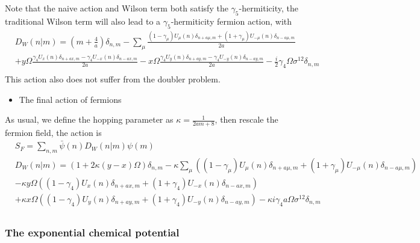 Note that the naive action and Wilson term both satisfy the $\gamma _5$-hermiticity, the traditional Wilson term will also lead to a $\gamma _5$-hermiticity fermion action, with
\begin{equation}
\begin{split}
&D_W(n|m)=\left(m+\frac{4}{a}\right)\delta _{n,m}-\sum _{\mu}\frac{(1-\gamma _{\mu})U_{\mu}(n)\delta _{n+a\mu,m}+(1+\gamma _{\mu})U_{-\mu}(n)\delta _{n-a\mu,m}}{2a}\\
&+y\Omega \frac{\gamma _4U_{x}(n)\delta _{n+ax,m}-\gamma _4U_{-x}(n)\delta _{n-ax,m}}{2a}-x\Omega \frac{\gamma _4U_{y}(n)\delta _{n+ay,m}-\gamma _4U_{-y}(n)\delta _{n-ay,m}}{2a} -\frac{i}{2}\gamma _4\Omega \sigma ^{12}\delta _{n,m}\\
\end{split}
\end{equation}
This action also does not suffer from the doubler problem.

\begin{itemize}
  \item The final action of fermions
\end{itemize}

As usual, we define the hopping parameter as $\kappa = \frac{1}{2am+8}$, then rescale the fermion field, the action is
\begin{equation}
\begin{split}
&S_F=\sum _{n,m}\bar{\psi }(n) D_W(n|m) \psi(m)\\
&D_W(n|m)=\left(1+2\kappa(y-x)\Omega\right)\delta _{n,m}-\kappa\sum _{\mu}\left((1-\gamma _{\mu})U_{\mu}(n)\delta _{n+a\mu,m}+(1+\gamma _{\mu})U_{-\mu}(n)\delta _{n-a\mu,m}\right)\\
&-\kappa y\Omega \left((1-\gamma _4)U_{x}(n)\delta _{n+ax,m}+(1+\gamma _4)U_{-x}(n)\delta _{n-ax,m}\right)\\
&+\kappa x\Omega \left((1-\gamma _4)U_{y}(n)\delta _{n+ay,m}+(1+\gamma _4)U_{-y}(n)\delta _{n-ay,m}\right) -\kappa i\gamma _4a\Omega \sigma ^{12}\delta _{n,m}\\
\end{split}
\end{equation}

\subsubsection{\label{sec:ExponentialChemicalPotential}The exponential chemical potential}

